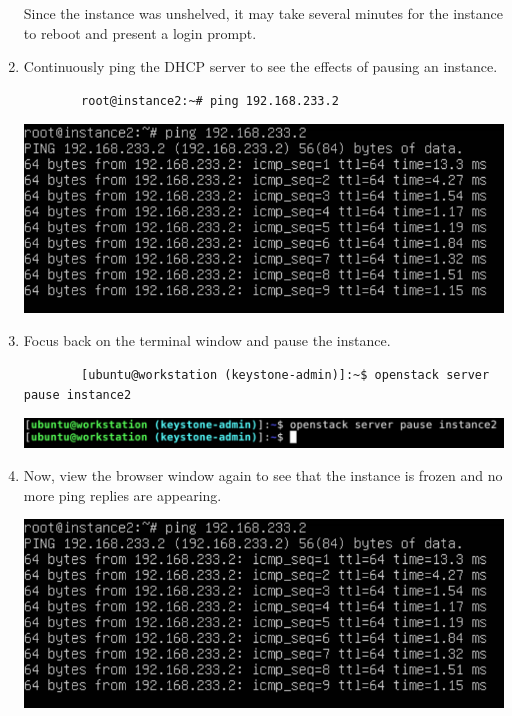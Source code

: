 \documentclass[letterpaper, 12pt]{article}
\begin{document}
\begin{enumerate}
    \begin{notebox}
        Since the instance was unshelved, it may take several minutes for the instance to reboot and present a login
        prompt.
    \end{notebox}

    \item Continuously ping the DHCP server to see the effects of pausing an instance.
    \begin{lstlisting}
        root@instance2:~# ping 192.168.233.2
    \end{lstlisting}

    \begin{center}
        \includegraphics[width=\linewidth]{images/part4/step4.png}
    \end{center}

    \item Focus back on the terminal window and pause the instance.
    \begin{lstlisting}
        [ubuntu@workstation (keystone-admin)]:~$ openstack server pause instance2
    \end{lstlisting}

    \begin{center}
        \includegraphics[width=\linewidth]{images/part4/step5.png}
    \end{center}

    \item Now, view the browser window again to see that the instance is frozen and no more ping replies are appearing.

    \begin{center}
        \includegraphics[width=\linewidth]{images/part4/step6.png}
    \end{center}


\end{enumerate}
\end{document}
